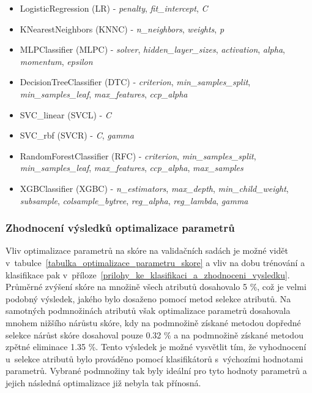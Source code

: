 \begin{itemize}
    \item LogisticRegression (LR) - \textit{penalty}, \textit{fit\_intercept}, \textit{C}
    \item KNearestNeighbors (KNNC) - \textit{n\_neighbors}, \textit{weights}, \textit{p}
    \item MLPClassifier (MLPC) - \textit{solver}, \textit{hidden\_layer\_sizes}, \textit{activation}, \textit{alpha}, \textit{momentum}, \textit{epsilon}
    \item DecisionTreeClassifier (DTC) - \textit{criterion}, \textit{min\_samples\_split}, \textit{min\_samples\_leaf},
    \newline \textit{max\_features}, \textit{ccp\_alpha}
    \item SVC\_linear (SVCL) - \textit{C}
    \item SVC\_rbf (SVCR) - \textit{C}, \textit{gamma}
    \item RandomForestClassifier (RFC) - \textit{criterion}, \textit{min\_samples\_split}, \textit{min\_samples\_leaf}, \textit{max\_features}, \textit{ccp\_alpha}, \textit{max\_samples}
    \item XGBClassifier (XGBC) - \textit{n\_estimators}, \textit{max\_depth}, \textit{min\_child\_weight}, \textit{subsample}, \textit{colsample\_bytree}, \textit{reg\_alpha}, \textit{reg\_lambda}, \textit{gamma}
\end{itemize}

\subsubsection*{Zhodnocení výsledků optimalizace parametrů}
\label{NIS_zhodnoceni_vysledku_optimalizace_parametru}

Vliv optimalizace parametrů na skóre na validačních sadách je možné vidět v~tabulce~\ref{tabulka_optimalizace_parametru_skore} a vliv na dobu trénování a klasifikace pak v~příloze~\ref{prilohy_ke_klasifikaci_a_zhodnoceni_vysledku}. Průměrné zvýšení skóre na množině všech atributů dosahovalo 5 \%, což je velmi podobný výsledek, jakého bylo dosaženo pomocí metod selekce atributů. Na samotných podmnožinách atributů však optimalizace parametrů dosahovala mnohem nižšího nárůstu skóre, kdy na podmnožině získané metodou dopředné selekce nárůst skóre dosahoval pouze 0.32 \% a na podmnožině získané metodou zpětné eliminace 1.35 \%. Tento výsledek je možné vysvětlit tím, že vyhodnocení u~selekce atributů bylo prováděno pomocí klasifikátorů s~výchozími hodnotami parametrů. Vybrané podmnožiny tak byly ideální pro tyto hodnoty parametrů a jejich následná optimalizace již nebyla tak přínosná.

